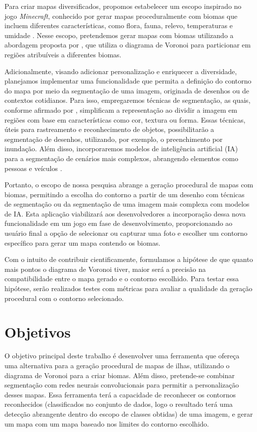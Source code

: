 Para criar mapas diversificados, propomos estabelecer um escopo inspirado no jogo \textit{Minecraft}, conhecido por gerar mapas proceduralmente com biomas que incluem diferentes características, como flora, fauna, relevo, temperaturas e umidade \cite{mojang}. Nesse escopo, pretendemos gerar mapas com biomas utilizando a abordagem proposta por , que utiliza o diagrama de Voronoi para particionar em regiões atribuíveis a diferentes biomas.

Adicionalmente, visando adicionar personalização e enriquecer a diversidade, planejamos implementar uma funcionalidade que permita a definição do contorno do mapa por meio da segmentação de uma imagem, originada de desenhos ou de contextos cotidianos. Para isso, empregaremos técnicas de segmentação, as quais, conforme afirmado por , simplificam a representação ao dividir a imagem em regiões com base em características como cor, textura ou forma. Essas técnicas, úteis para rastreamento e reconhecimento de objetos, possibilitarão a segmentação de desenhos, utilizando, por exemplo, o preenchimento por inundação. Além disso, incorporaremos modelos de inteligência artificial (IA) para a segmentação de cenários mais complexos, abrangendo elementos como pessoas e veículos \cite{saiwa, OpenCVFloodFill, dp_semantic_segmantation}.

Portanto, o escopo de nossa pesquisa abrange a geração procedural de mapas com biomas, permitindo a escolha do contorno a partir de um desenho com técnicas de segmentação ou da segmentação de uma imagem mais complexa com modelos de IA. Esta aplicação viabilizará aos desenvolvedores a incorporação dessa nova funcionalidade em um jogo em fase de desenvolvimento, proporcionando ao usuário final a opção de selecionar ou capturar uma foto e escolher um contorno específico para gerar um mapa contendo os biomas.

Com o intuito de contribuir cientificamente, formulamos a hipótese de que quanto mais pontos o diagrama de Voronoi tiver, maior será a precisão na compatibilidade entre o mapa gerado e o contorno escolhido. Para testar essa hipótese, serão realizados testes com métricas para avaliar a qualidade da geração procedural com o contorno selecionado.

\section{Objetivos}

O objetivo principal deste trabalho é desenvolver uma ferramenta que ofereça uma alternativa para a geração procedural de mapas de ilhas, utilizando o diagrama de Voronoi para a criar biomas. Além disso, pretende-se combinar segmentação com redes neurais convolucionais para permitir a personalização desses mapas. Essa ferramenta terá a capacidade de reconhecer os contornos reconhecidos (classificados no conjunto de dados, logo o resultado terá uma detecção abrangente dentro do escopo de classes obtidas) de uma imagem, e gerar um mapa com um mapa baseado nos limites do contorno escolhido.

